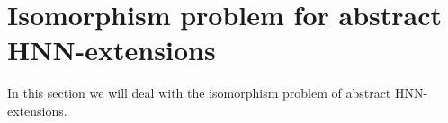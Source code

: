 \documentclass[a4paper,12pt]{article}
\newtheorem{prop}[thm]{Proposition}
\begin{document}
{%




\section{Isomorphism problem for abstract HNN-extensions} \label{iso abstract HNN}


In this section we will deal with the isomorphism problem of abstract HNN-extensions. 




}
\end{document}
